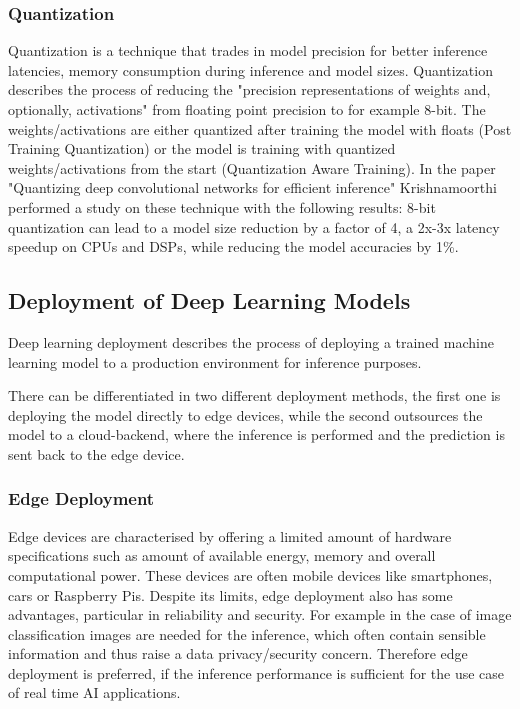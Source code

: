 \subsubsection{Quantization}
\label{chap:quant}
Quantization is a technique that trades in model precision for better inference latencies, memory consumption during inference and model sizes.
Quantization describes the process of reducing the "precision representations of weights and, optionally, activations" \cite{tfLiteQuant} from floating point precision to for example 8-bit.
The weights/activations are either quantized after training the model with floats (Post Training Quantization) or the model is training with quantized weights/activations from the start (Quantization Aware Training). In the paper "Quantizing deep convolutional networks for
efficient inference"\cite{Quantizing} Krishnamoorthi performed a study on these technique with the following results:
8-bit quantization can lead to a model size reduction by a factor of 4, a 2x-3x latency speedup on CPUs and DSPs, while reducing the model accuracies by 1\%.


\subsection{Deployment of Deep Learning Models}
Deep learning deployment describes the process of deploying a trained machine learning model to a production environment for inference purposes. 

There can be differentiated in two different deployment methods, the first one is deploying the model directly to edge devices, while the second outsources the model to a cloud-backend, where the inference is performed and the prediction is sent back to the edge device.
\subsubsection{Edge Deployment}
Edge devices are characterised by offering a limited amount of hardware specifications such as amount of available energy, memory and overall computational power.
These devices are often mobile devices like smartphones, cars or Raspberry Pis.
Despite its limits, edge deployment also has some advantages, particular in reliability and security. 
For example in the case of image classification images are needed for the inference, which often contain sensible information and thus raise a data privacy/security concern.
Therefore edge deployment is preferred, if the inference performance is sufficient for the use case of real time AI applications.


